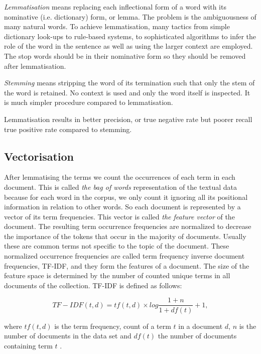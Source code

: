 \emph{Lemmatisation} means replacing each inflectional form of a 
word with its nominative (i.e. dictionary) form, or lemma. 
The problem is the ambiguousness of many natural words. To 
achieve lemmatisation, many tactics from simple dictionary look-ups to 
rule-based systems, to sophisticated algorithms to infer the role 
of the word in the sentence as well as using the larger context are
employed. The stop words should be in their nominative form so they 
should be removed after lemmatisation.

\emph{Stemming} means stripping the word of its termination such 
that only the stem of the word is retained. No context is used 
and only the word itself is inspected. It is much simpler procedure
compared to lemmatisation.

Lemmatisation results in better precision, or true negative rate 
but poorer recall true positive rate compared to stemming. 
\cite{manning_introduction_2008}


\subsection{Vectorisation}
After lemmatising the terms we count the occurrences of each term 
in each document. This is called \emph{the bag of words} 
representation of the textual data because for each word in the 
corpus, we only count it ignoring all its positional information 
in relation to other words. So each document is represented by
a vector of its term frequencies. This vector is called \emph{the 
feature vector} of the document. 
The resulting term occurrence 
frequencies are normalized to decrease the importance of the 
tokens that occur in the majority of documents. Usually these are 
common terms not specific to the topic of the document. 
These normalized occurrence frequencies are called term 
frequency inverse document frequencies, TF-IDF, and 
they form the features of a document. The size of the feature 
space is determined by the number of counted unique terms in all 
documents of the collection. 
TF-IDF is defined as follows:

\begin{equation}
 TF-IDF(t,d) = tf(t,d) \times log \frac{1+n}{1+df(t)} + 1,
\end{equation}

where $tf(t,d)$ is the term frequency, count of a term $t$ in a 
document $d$, $n$ is the number of documents in the data set and 
$df(t)$ the number of documents containing term $t$ 
\cite{luhn_statistical_1957} \cite{jones_statistical_1972}.

